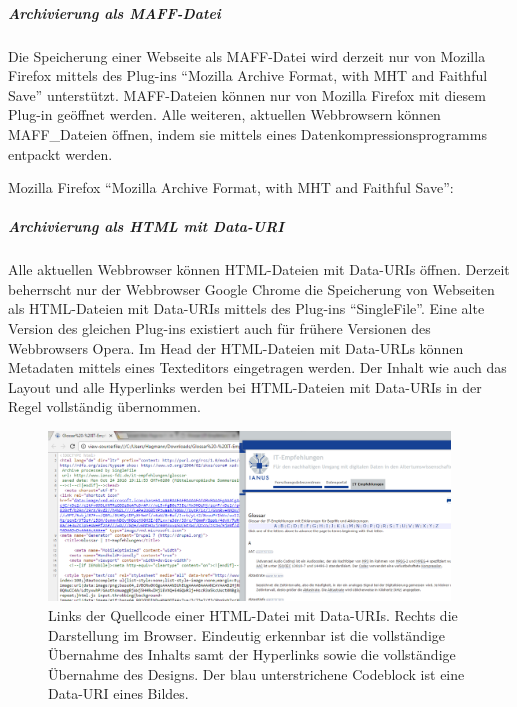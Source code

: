 \subparagraph{Archivierung als MAFF-Datei}

Die Speicherung einer Webseite als MAFF-Datei wird derzeit nur von Mozilla Firefox mittels des Plug-ins "`Mozilla Archive Format, with MHT and Faithful Save"' unterstützt. MAFF-Dateien können nur von Mozilla Firefox mit diesem Plug-in geöffnet werden. Alle weiteren, aktuellen Webbrowsern können MAFF\_Dateien öffnen, indem sie mittels eines Datenkompressionsprogramms entpackt werden.
 

\begin{flushleft}
	Mozilla Firefox "`Mozilla Archive Format, with MHT and Faithful Save"': 
\end{flushleft}


\subparagraph{Archivierung als HTML mit Data-URI}

Alle aktuellen Webbrowser können HTML-Dateien mit Data-URIs öffnen. Derzeit beherrscht nur der Webbrowser Google Chrome die Speicherung von Webseiten als HTML-Dateien mit Data-URIs mittels des Plug-ins "`SingleFile"'. Eine alte Version des gleichen Plug-ins existiert auch für frühere Versionen des Webbrowsers Opera.  Im Head der HTML-Dateien mit Data-URLs können Metadaten mittels eines Texteditors eingetragen werden. Der Inhalt wie auch das Layout und alle Hyperlinks werden bei HTML-Dateien mit Data-URIs in der Regel vollständig übernommen.

\begin{figure}[h!tb]
  \begin{center}
    \includegraphics[width=0.95\textwidth]{bilder/web_datauri}
  \end{center}
  \caption{Links der Quellcode einer HTML-Datei mit Data-URIs. Rechts die Darstellung im Browser. Eindeutig erkennbar ist die vollständige Übernahme des Inhalts samt der Hyperlinks sowie die vollständige Übernahme des Designs. Der blau unterstrichene Codeblock ist eine Data-URI eines Bildes.}
\end{figure}


